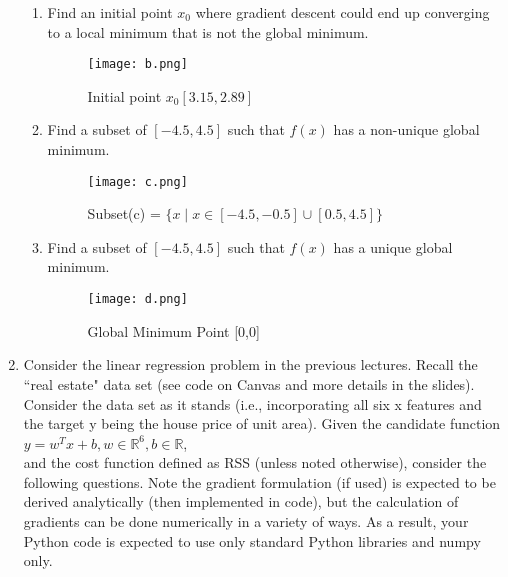 \documentclass{assignment}
\newcommand{\R}{\mathbb{R}}
\begin{document}
\begin{problem}
\begin{enumerate}
\begin{enumerate}
        \item Find an initial point $x_0$ where gradient descent could end up converging to a local minimum that is not the global minimum.\\

            \begin{figure}[H]
                \centering
                \texttt{[image: b.png]}
                \caption{Initial point $x_0 [3.15, 2.89]$}
                \label{fig:enter-label}
            \end{figure}

        \item Find a subset of $[−4.5, 4.5]$ such that $f(x)$ has a non-unique global minimum.\\ 
        
            \begin{figure}[H]
                \centering
                \texttt{[image: c.png]}
                \caption{Subset(c) = $\{ x \mid x \in [-4.5, -0.5] \cup [0.5, 4.5] \}$}
                \label{fig:enter-label}
            \end{figure}
    

        \item Find a subset of $[−4.5, 4.5]$ such that $f(x)$ has a unique global minimum.\\

        \begin{figure}[H]
            \centering
            \texttt{[image: d.png]}
            \caption{Global Minimum Point [0,0]}
            \label{fig:enter-label}
        \end{figure}
    \end{enumerate}
\item Consider the linear regression problem in the previous lectures. Recall the “real estate" data set (see code on Canvas and more details in the slides). Consider the data set as it stands (i.e., incorporating all six x features and the target y being the house price of unit area). Given the candidate function\\ 

$y = w^Tx + b, w \in \R^6, b \in \R$, \\

and the cost function defined as RSS (unless noted otherwise), consider the following questions. Note the gradient formulation (if used) is expected to be derived analytically (then implemented in code), but the calculation of gradients can be done numerically in a variety of ways. As a result, your Python code is expected to use only standard Python libraries and numpy only.


\end{enumerate}
\end{problem}
\end{document}
